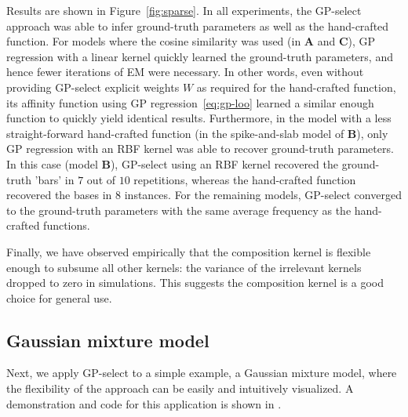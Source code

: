 Results are shown in Figure~\ref{fig:sparse}.
In all experiments, the GP-select approach was able to infer ground-truth parameters as well as the hand-crafted function.
For models where the cosine similarity was used (in \textbf{A} and \textbf{C}), GP regression with a linear kernel quickly learned the ground-truth parameters, and hence fewer iterations of EM were necessary.
In other words, even without providing GP-select explicit weights $W$ as required for the hand-crafted function, its affinity function using GP regression~\eqref{eq:gp-loo} learned a similar enough function to quickly yield identical results.
Furthermore, in the model with a less straight-forward hand-crafted function (in the spike-and-slab model of \textbf{B}), only GP regression with an RBF kernel was able to recover ground-truth parameters.
In this case (model \textbf{B}), GP-select using an RBF kernel recovered the ground-truth 'bars' in $7$ out of $10$ repetitions, whereas the hand-crafted function recovered the bases in $8$ instances.
For the remaining models, GP-select converged to the ground-truth parameters with the same average frequency as the hand-crafted functions.


Finally, we have observed empirically that the composition kernel is flexible enough to subsume all other kernels:
the variance of the irrelevant kernels dropped to zero in simulations.
This suggests the composition kernel is a good choice  for general use. 


\subsection{Gaussian mixture model}
%
Next, we apply GP-select to a simple example, a Gaussian mixture model, where the flexibility of the approach can be easily and intuitively visualized. A demonstration and code for this application is shown in \citep{GP-selectNotebook16}.


